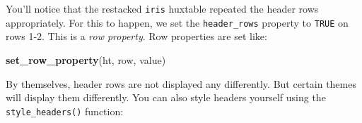 \documentclass[]{article}
\newenvironment{Shaded}{\begin{snugshade}}{\end{snugshade}}
\newcommand{\DataTypeTok}[1]{\textcolor[rgb]{0.13,0.29,0.53}{#1}}
\newcommand{\DecValTok}[1]{\textcolor[rgb]{0.00,0.00,0.81}{#1}}
\newcommand{\KeywordTok}[1]{\textcolor[rgb]{0.13,0.29,0.53}{\textbf{#1}}}
\newcommand{\NormalTok}[1]{#1}
\newcommand{\OperatorTok}[1]{\textcolor[rgb]{0.81,0.36,0.00}{\textbf{#1}}}
\newcommand{\OtherTok}[1]{\textcolor[rgb]{0.56,0.35,0.01}{#1}}
\newcommand{\StringTok}[1]{\textcolor[rgb]{0.31,0.60,0.02}{#1}}
\begin{document}
You'll notice that the restacked \texttt{iris} huxtable repeated the
header rows appropriately. For this to happen, we set the
\texttt{header\_rows} property to \texttt{TRUE} on rows 1-2. This is a
\emph{row property}. Row properties are set like:

\begin{Shaded}
\begin{Highlighting}[]
\KeywordTok{set_row_property}\NormalTok{(ht, row, value)}
\end{Highlighting}
\end{Shaded}

\FloatBarrier

By themselves, header rows are not displayed any differently. But
certain themes will display them differently. You can also style headers
yourself using the \texttt{style\_headers()} function:

\begin{Shaded}
\end{Shaded}

 
  \providecommand{\huxb}[2]{\arrayrulecolor[RGB]{#1}\global\arrayrulewidth=#2pt}
  \providecommand{\huxvb}[2]{\color[RGB]{#1}\vrule width #2pt}
  \providecommand{\huxtpad}[1]{\rule{0pt}{#1}}
  \providecommand{\huxbpad}[1]{\rule[-#1]{0pt}{#1}}
\end{document}
